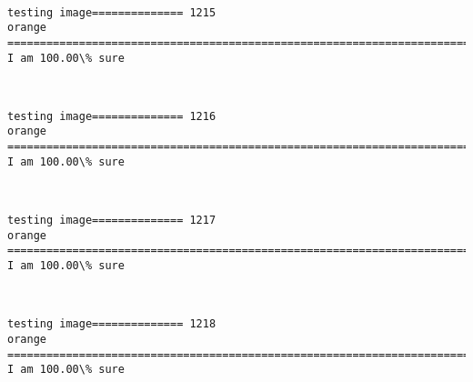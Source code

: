 \documentclass[11pt]{article}
\begin{document}
    \begin{center}
    \end{center}
    { \hspace*{\fill} \\}
    
    \begin{Verbatim}[commandchars=\\\{\}]
testing image============== 1215
orange
============================================================================
I am 100.00\% sure

    \end{Verbatim}

    \begin{center}
    \end{center}
    { \hspace*{\fill} \\}
    
    \begin{Verbatim}[commandchars=\\\{\}]
testing image============== 1216
orange
============================================================================
I am 100.00\% sure

    \end{Verbatim}

    \begin{center}
    \end{center}
    { \hspace*{\fill} \\}
    
    \begin{Verbatim}[commandchars=\\\{\}]
testing image============== 1217
orange
============================================================================
I am 100.00\% sure

    \end{Verbatim}

    \begin{center}
    \end{center}
    { \hspace*{\fill} \\}
    
    \begin{Verbatim}[commandchars=\\\{\}]
testing image============== 1218
orange
============================================================================
I am 100.00\% sure

    \end{Verbatim}
\end{document}
